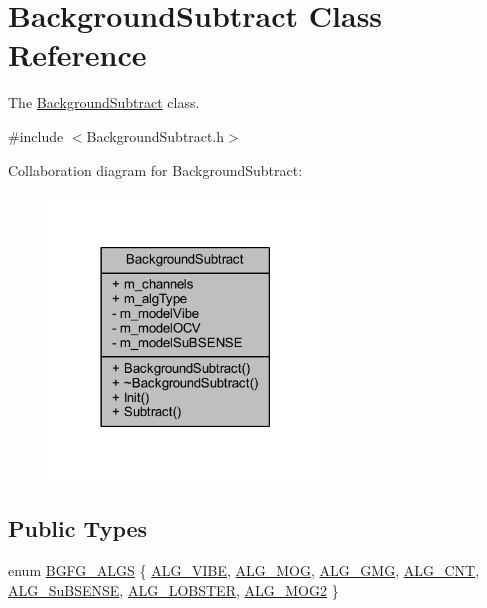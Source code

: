\hypertarget{class_background_subtract}{}\section{Background\+Subtract Class Reference}
\label{class_background_subtract}


The \mbox{\hyperlink{class_background_subtract}{Background\+Subtract}} class.  




{\ttfamily \#include $<$Background\+Subtract.\+h$>$}



Collaboration diagram for Background\+Subtract\+:\nopagebreak
\begin{figure}[H]
\begin{center}
\leavevmode
\includegraphics[width=206pt]{class_background_subtract__coll__graph}
\end{center}
\end{figure}
\subsection*{Public Types}
\begin{DoxyCompactItemize}
\item 
enum \mbox{\hyperlink{class_background_subtract_a56850081696df68b55f87b4f3d87949f}{B\+G\+F\+G\+\_\+\+A\+L\+GS}} \{ \newline
\mbox{\hyperlink{class_background_subtract_a56850081696df68b55f87b4f3d87949fa1905f812773a0029b59688e57990f172}{A\+L\+G\+\_\+\+V\+I\+BE}}, 
\mbox{\hyperlink{class_background_subtract_a56850081696df68b55f87b4f3d87949fa6ce3f5db7dc79642df7c113be3a28d14}{A\+L\+G\+\_\+\+M\+OG}}, 
\mbox{\hyperlink{class_background_subtract_a56850081696df68b55f87b4f3d87949fa3d46f57cfb0a9b1b5b037b387a35f652}{A\+L\+G\+\_\+\+G\+MG}}, 
\mbox{\hyperlink{class_background_subtract_a56850081696df68b55f87b4f3d87949fa4e734ae21b8add9022427f8da9469cfb}{A\+L\+G\+\_\+\+C\+NT}}, 
\newline
\mbox{\hyperlink{class_background_subtract_a56850081696df68b55f87b4f3d87949fa0a4e184ec94bca58e58dd4226f1b1f7f}{A\+L\+G\+\_\+\+Su\+B\+S\+E\+N\+SE}}, 
\mbox{\hyperlink{class_background_subtract_a56850081696df68b55f87b4f3d87949fae4cc76d1ae01949bc7e6be6ed046ddaf}{A\+L\+G\+\_\+\+L\+O\+B\+S\+T\+ER}}, 
\mbox{\hyperlink{class_background_subtract_a56850081696df68b55f87b4f3d87949fa35994e745da8eb824d3808ee50ad3ebf}{A\+L\+G\+\_\+\+M\+O\+G2}}
 \}
\end{DoxyCompactItemize}
